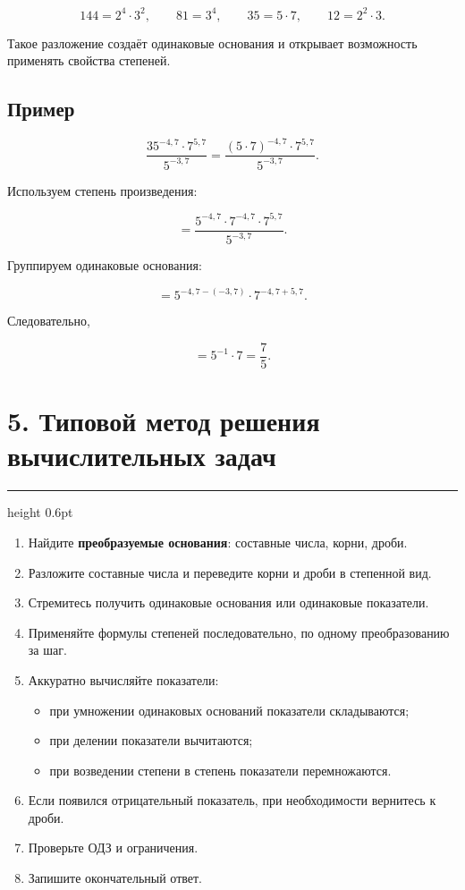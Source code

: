 \documentclass[a4paper,12pt]{article}
\newcommand{\sectionline}{
  \par
  \vspace{0.2em}
  {\color{accent}\hrule height 0.6pt}
  \vspace{0.8em}
}
\begin{document}
\[
144=2^4\cdot3^2,
\qquad
81=3^4,
\qquad
35=5\cdot7,
\qquad
12=2^2\cdot3.
\]

Такое разложение создаёт одинаковые основания и открывает возможность
применять свойства степеней.

\subsection*{Пример}

\[
\frac{35^{-4{,}7}\cdot7^{5{,}7}}{5^{-3{,}7}}
=
\frac{(5\cdot7)^{-4{,}7}\cdot7^{5{,}7}}
{5^{-3{,}7}}.
\]

Используем степень произведения:

\[
=
\frac{5^{-4{,}7}\cdot7^{-4{,}7}\cdot7^{5{,}7}}
{5^{-3{,}7}}.
\]

Группируем одинаковые основания:

\[
=
5^{-4{,}7-(-3{,}7)}
\cdot
7^{-4{,}7+5{,}7}.
\]

Следовательно,

\[
=
5^{-1}\cdot7
=
\frac75.
\]


\section*{5. Типовой метод решения вычислительных задач}
\sectionline

\begin{enumerate}
  \item Найдите \textbf{преобразуемые основания}:
  составные числа, корни, дроби.

  \item Разложите составные числа и переведите корни и дроби в
  степенной вид.

  \item Стремитесь получить одинаковые основания или одинаковые
  показатели.

  \item Применяйте формулы степеней последовательно, по одному
  преобразованию за шаг.

  \item Аккуратно вычисляйте показатели:
  \begin{itemize}
    \item при умножении одинаковых оснований показатели складываются;
    \item при делении показатели вычитаются;
    \item при возведении степени в степень показатели перемножаются.
  \end{itemize}

  \item Если появился отрицательный показатель, при необходимости
  вернитесь к дроби.

  \item Проверьте ОДЗ и ограничения.

  \item Запишите окончательный ответ.
\end{enumerate}
\end{document}

